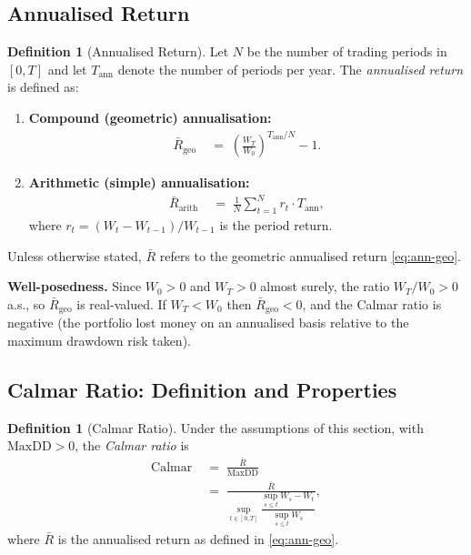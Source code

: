 \documentclass[12pt,openany]{book}
\newcommand{\MaxDD}{\mathrm{MaxDD}}
\numberwithin{equation}{chapter}
\theoremstyle{plain}
\theoremstyle{definition}
\newtheorem{definition}[theorem]{Definition}
\theoremstyle{remark}
\numberwithin{equation}{chapter}
\theoremstyle{plain}
\begin{document}
\subsection{Annualised Return}

\begin{definition}[Annualised Return]
\label{def:ann-return}
Let $N$ be the number of trading periods in $[0,T]$
and let $T_{\mathrm{ann}}$ denote the number of periods
per year.  The \emph{annualised return} is defined as:
\begin{enumerate}
  \item \textbf{Compound (geometric) annualisation:}
        \begin{align}
          \bar{R}_{\mathrm{geo}}
            &\;=\; \left(\frac{W_T}{W_0}\right)^{T_{\mathrm{ann}}/N}
                   - 1.
          \label{eq:ann-geo}
        \end{align}
  \item \textbf{Arithmetic (simple) annualisation:}
        \begin{align}
          \bar{R}_{\mathrm{arith}}
            &\;=\; \frac{1}{N}
                   \sum_{t=1}^{N} r_t
                   \cdot T_{\mathrm{ann}},
          \label{eq:ann-arith}
        \end{align}
        where $r_t = (W_t - W_{t-1})/W_{t-1}$ is the
        period return.
\end{enumerate}
Unless otherwise stated, $\bar{R}$ refers to the geometric
annualised return \eqref{eq:ann-geo}.
\end{definition}

\noindent
\textbf{Well-posedness.}
Since $W_0 > 0$ and $W_T > 0$ almost surely, the ratio
$W_T/W_0 > 0$ a.s., so $\bar{R}_{\mathrm{geo}}$ is
real-valued.  If $W_T < W_0$ then
$\bar{R}_{\mathrm{geo}} < 0$, and the Calmar ratio
is negative (the portfolio lost money on an annualised
basis relative to the maximum drawdown risk taken).

\subsection{Calmar Ratio: Definition and Properties}

\begin{definition}[Calmar Ratio]
\label{def:calmar}
Under the assumptions of this section, with
$\MaxDD > 0$, the \emph{Calmar ratio} is
\begin{align}
  \mathrm{Calmar}
    &\;=\; \frac{\bar{R}}{\MaxDD}
  \label{eq:calmar1} \\
    &\;=\; \frac{\bar{R}}{\displaystyle
           \sup_{t \in [0,T]}
           \dfrac{\sup_{s \leq t} W_s - W_t}
                 {\sup_{s \leq t} W_s}},
  \label{eq:calmar}
\end{align}
where $\bar{R}$ is the annualised return as defined in
\eqref{eq:ann-geo}.
\end{definition}
\end{document}
